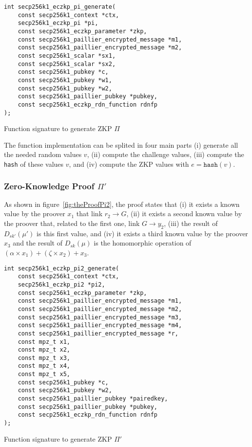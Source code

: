 \begin{listing}
  \begin{verbatim}
int secp256k1_eczkp_pi_generate(
    const secp256k1_context *ctx,
    secp256k1_eczkp_pi *pi,
    const secp256k1_eczkp_parameter *zkp,
    const secp256k1_paillier_encrypted_message *m1,
    const secp256k1_paillier_encrypted_message *m2,
    const secp256k1_scalar *sx1,
    const secp256k1_scalar *sx2,
    const secp256k1_pubkey *c,
    const secp256k1_pubkey *w1,
    const secp256k1_pubkey *w2,
    const secp256k1_paillier_pubkey *pubkey,
    const secp256k1_eczkp_rdn_function rdnfp
);
  \end{verbatim}
	\caption{Function signature to generate ZKP $\Pi$}
	\label{lst:funcSigGeneratePi}
\end{listing}

The function implementation can be splited in four main parts (i) generate all
the needed random values $v$, (ii) compute the challenge values, (iii) compute
the \texttt{hash} of these values $v$, and (iv) compute the ZKP values with $e =
\texttt{hash}(v)$.

\subsubsection{Zero-Knowledge Proof $\Pi'$}

As shown in figure~\ref{fig:theProofPi2}, the proof states that (i) it exists a
known value by the proover $x_1$ that link $r_2 \rightarrow G$, (ii) it exists a
second known value by the proover that, related to the first one, link $G
\rightarrow y_2$, (iii) the result of $D_{sk'}(\mu')$ is this first value, and
(iv) it exists a third known value by the proover $x_3$ and the result of
$D_{sk}(\mu)$ is the homomorphic operation of $(\alpha \times x_1) + (\zeta
\times x_2) + x_3$.

\begin{listing}
  \begin{verbatim}
int secp256k1_eczkp_pi2_generate(
    const secp256k1_context *ctx,
    secp256k1_eczkp_pi2 *pi2,
    const secp256k1_eczkp_parameter *zkp,
    const secp256k1_paillier_encrypted_message *m1,
    const secp256k1_paillier_encrypted_message *m2,
    const secp256k1_paillier_encrypted_message *m3,
    const secp256k1_paillier_encrypted_message *m4,
    const secp256k1_paillier_encrypted_message *r,
    const mpz_t x1,
    const mpz_t x2,
    const mpz_t x3,
    const mpz_t x4,
    const mpz_t x5,
    const secp256k1_pubkey *c,
    const secp256k1_pubkey *w2,
    const secp256k1_paillier_pubkey *pairedkey,
    const secp256k1_paillier_pubkey *pubkey,
    const secp256k1_eczkp_rdn_function rdnfp
);
  \end{verbatim}
	\caption{Function signature to generate ZKP $\Pi'$}
	\label{lst:funcSigGeneratePi2}
\end{listing}

